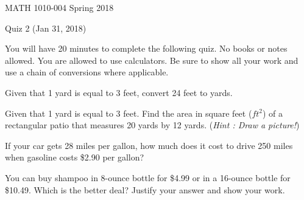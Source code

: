 \documentclass[10.5pt]{article}
\begin{document}
MATH 1010-004 Spring 2018

Quiz 2 (Jan 31, 2018) \hspace{1.9in}  {\underline {\hspace{2.5in}}}
\vspace{2pc}

You will have 20 minutes to complete the following quiz.  No books or notes allowed.  You are allowed to use calculators.  Be sure to show all your work and use a chain of conversions where applicable.
\vspace{1pc}

\begin{problem}{4} Given that 1 yard is equal to 3 feet, convert 24 feet to yards. 
\vspace{2.0in}
\end{problem}

\begin{problem}{6} Given that 1 yard is equal to 3 feet. Find the area in square feet ($ft^2$) of a rectangular patio that measures 20 yards by 12 yards. ({\it Hint : Draw a picture!})
\vspace{2.5in}
\end{problem}
 

\newpage

\begin{problem}{5} If your car gets 28 miles per gallon, how much does it cost to drive 250 miles when gasoline costs \$2.90 per gallon?
\vspace{3in}
\end{problem}

\begin{problem}{5} You can buy shampoo in 8-ounce bottle for \$4.99 or in a 16-ounce bottle for \$10.49. Which is the better deal? Justify your answer and show your work.
\vspace{3in}
\end{problem}


\showpoints
\end{document}
